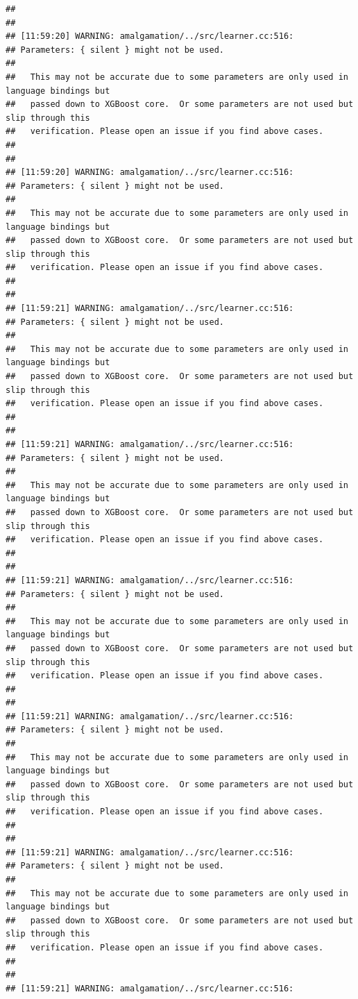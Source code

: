 \documentclass[AMS,STIX2COL]{WileyNJD-v2}\usepackage[]{graphicx}\usepackage[]{color}
\makeatletter
\newenvironment{kframe}{%
 \def\at@end@of@kframe{}%
 \ifinner\ifhmode%
  \def\at@end@of@kframe{\end{minipage}}%
  \begin{minipage}{\columnwidth}%
 \fi\fi%
 \def\FrameCommand##1{\hskip\@totalleftmargin \hskip-\fboxsep
 \colorbox{shadecolor}{##1}\hskip-\fboxsep
     \hskip-\linewidth \hskip-\@totalleftmargin \hskip\columnwidth}%
 \MakeFramed {\advance\hsize-\width
   \@totalleftmargin\z@ \linewidth\hsize
   \@setminipage}}%
 {\par\unskip\endMakeFramed%
 \at@end@of@kframe}
\newenvironment{knitrout}{}{} %
\makeatother
\begin{document}
\begin{knitrout}
\begin{kframe}
\begin{verbatim}
## 
## 
## [11:59:20] WARNING: amalgamation/../src/learner.cc:516: 
## Parameters: { silent } might not be used.
## 
##   This may not be accurate due to some parameters are only used in language bindings but
##   passed down to XGBoost core.  Or some parameters are not used but slip through this
##   verification. Please open an issue if you find above cases.
## 
## 
## [11:59:20] WARNING: amalgamation/../src/learner.cc:516: 
## Parameters: { silent } might not be used.
## 
##   This may not be accurate due to some parameters are only used in language bindings but
##   passed down to XGBoost core.  Or some parameters are not used but slip through this
##   verification. Please open an issue if you find above cases.
## 
## 
## [11:59:21] WARNING: amalgamation/../src/learner.cc:516: 
## Parameters: { silent } might not be used.
## 
##   This may not be accurate due to some parameters are only used in language bindings but
##   passed down to XGBoost core.  Or some parameters are not used but slip through this
##   verification. Please open an issue if you find above cases.
## 
## 
## [11:59:21] WARNING: amalgamation/../src/learner.cc:516: 
## Parameters: { silent } might not be used.
## 
##   This may not be accurate due to some parameters are only used in language bindings but
##   passed down to XGBoost core.  Or some parameters are not used but slip through this
##   verification. Please open an issue if you find above cases.
## 
## 
## [11:59:21] WARNING: amalgamation/../src/learner.cc:516: 
## Parameters: { silent } might not be used.
## 
##   This may not be accurate due to some parameters are only used in language bindings but
##   passed down to XGBoost core.  Or some parameters are not used but slip through this
##   verification. Please open an issue if you find above cases.
## 
## 
## [11:59:21] WARNING: amalgamation/../src/learner.cc:516: 
## Parameters: { silent } might not be used.
## 
##   This may not be accurate due to some parameters are only used in language bindings but
##   passed down to XGBoost core.  Or some parameters are not used but slip through this
##   verification. Please open an issue if you find above cases.
## 
## 
## [11:59:21] WARNING: amalgamation/../src/learner.cc:516: 
## Parameters: { silent } might not be used.
## 
##   This may not be accurate due to some parameters are only used in language bindings but
##   passed down to XGBoost core.  Or some parameters are not used but slip through this
##   verification. Please open an issue if you find above cases.
## 
## 
## [11:59:21] WARNING: amalgamation/../src/learner.cc:516: 

\end{verbatim}
\end{kframe}
\end{knitrout}
\end{document}
